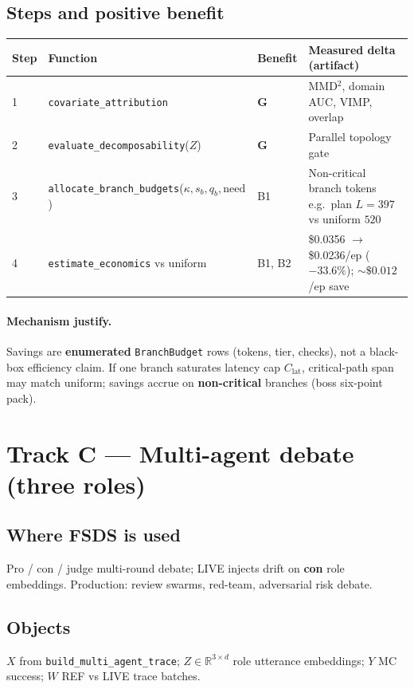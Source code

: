 \documentclass[11pt]{article}
\newcommand{\indirect}{\textbf{\small G}}
\begin{document}
\subsection{Steps and positive benefit}
\begin{center}
\begin{tabular}{@{}llll@{}}
\toprule
Step & Function & Benefit & Measured delta (artifact) \\
\midrule
1 & \texttt{covariate\_attribution} & \indirect & MMD$^2$, domain AUC, VIMP, overlap \\
2 & \texttt{evaluate\_decomposability}($Z$) & \indirect & Parallel topology gate \\
\rowcolor{rowbenefit}
3 & \texttt{allocate\_branch\_budgets}($\kappa,s_b,q_b,\mathrm{need}$) & B1 & Non-critical branch tokens e.g.\ plan $L=397$ vs uniform $520$ \\
\rowcolor{rowbenefit}
4 & \texttt{estimate\_economics} vs uniform & B1, B2 & \$0.0356 $\rightarrow$ \$0.0236/ep ($-33.6\%$); $\sim\$0.012$/ep save \\
\bottomrule
\end{tabular}
\end{center}

\paragraph{Mechanism justify.}
Savings are \textbf{enumerated} \texttt{BranchBudget} rows (tokens, tier, checks), not a black-box efficiency claim.
If one branch saturates latency cap $C_{\mathrm{lat}}$, critical-path span may match uniform; savings accrue on \textbf{non-critical} branches (boss six-point pack).

\section{Track C --- Multi-agent debate (three roles)}

\subsection{Where FSDS is used}
Pro / con / judge multi-round debate; LIVE injects drift on \textbf{con} role embeddings.
Production: review swarms, red-team, adversarial risk debate.

\subsection{Objects}
$X$ from \texttt{build\_multi\_agent\_trace}; $Z\in\mathbb{R}^{3\times d}$ role utterance embeddings; $Y$ MC success; $W$ REF vs LIVE trace batches.
\end{document}
